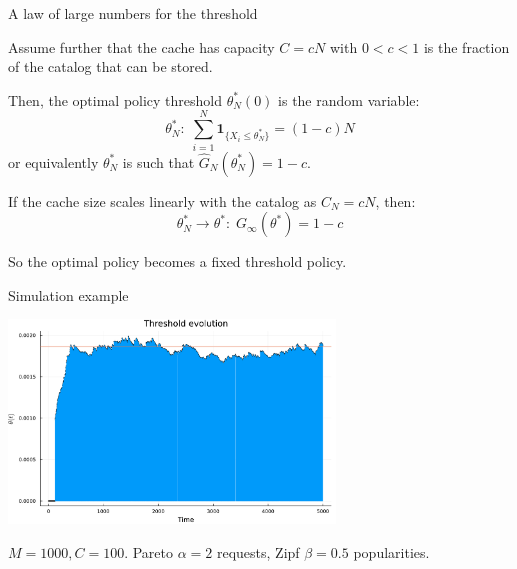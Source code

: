 \documentclass[aspectratio=169]{beamer}
\newcommand{\ind}[1]{\mathbf{1}_{#1}}
\begin{document}
\begin{frame}{A law of large numbers for the threshold}
	
	Assume further that the cache has capacity $C=cN$ with $0<c<1$ is the fraction of the catalog that can be stored.

	\pause

	Then, the optimal policy threshold $\theta^*_N(0)$ is the random variable:
	\begin{equation*}
		\theta^*_N: \; \sum_{i=1}^N \ind{\{X_i\leqslant \theta^*_N\}} = (1-c)N
	\end{equation*}
	or equivalently $\theta^*_N$ is such that $\hat{G}_N(\theta^*_N) = 1-c$.


	\pause \vfill

	\begin{corollary}
		If the cache size scales linearly with the catalog as $C_N = cN$, then:
		\begin{equation*}
			\theta^*_N \to \theta^*: \; G_\infty(\theta^*) = 1-c
		\end{equation*}
	\end{corollary}

	So the optimal policy becomes a \alert{fixed} threshold policy.
\end{frame}

\begin{frame}{Simulation example}
	\begin{center}
		\includegraphics[width=0.65\textwidth]{figuras/simulation_example.pdf}

		{\footnotesize $M=1000, C=100$. Pareto $\alpha=2$ requests, Zipf $\beta=0.5$  popularities.}
	\end{center}
\end{frame}
\end{document}
